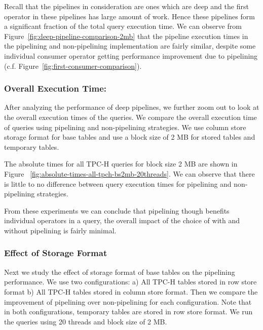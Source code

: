 Recall that the pipelines in consideration are ones which are deep and the first operator in these pipelines has large amount of work.
Hence these pipelines form a significant fraction of the total query execution time.
We can observe from Figure~\ref{fig:deep-pipeline-comparison-2mb} that the pipeline execution times in the pipelining and non-pipelining implementation are fairly similar, despite some individual consumer operator getting performance improvement due to pipelining (c.f. Figure~\ref{fig:first-consumer-comparison}). 

\subsubsection{Overall Execution Time:}\label{ssec:overall-execution-time} 
After analyzing the performance of deep pipelines, we further zoom out to look at the overall execution times of the queries. 
We compare the overall execution time of queries using pipelining and non-pipelining strategies. 
We use column store storage format for base tables and use a block size of 2 MB for stored tables and temporary tables.

The absolute times for all TPC-H queries for block size 2 MB are shown in Figure ~\ref{fig:absolute-times-all-tpch-bs2mb-20threads}.
We can observe that there is little to no difference between query execution times for pipelining and non-pipelining strategies. 

From these experiments we can conclude that pipelining though benefits individual operators in a query, the overall impact of the choice of with and without pipelining is fairly minimal.

\subsubsection{Effect of Storage Format}
Next we study the effect of storage format of base tables on the pipelining performance. 
We use two configurations: a) All TPC-H tables stored in row store format b) All TPC-H tables stored in column store format. 
Then we compare the improvement of pipelining over non-pipelining for each configuration. 
Note that in both configurations, temporary tables are stored in row store format. 
We run the queries using 20 threads and block size of 2 MB.

